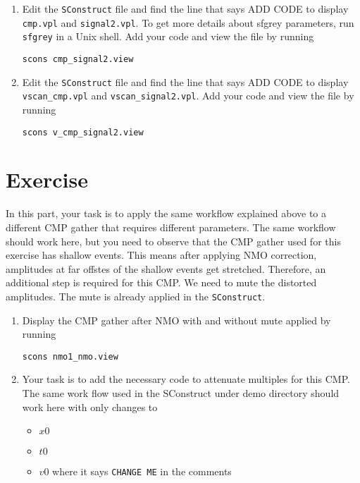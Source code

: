 \begin{enumerate}
\item Edit the \texttt{SConstruct} file and find the line that says ADD CODE to display \texttt{cmp.vpl} and \texttt{signal2.vpl}. To get more details about sfgrey parameters, run \texttt{sfgrey} in a Unix shell. Add your code and view the file by running
\begin{verbatim}
scons cmp_signal2.view
\end{verbatim}

\item Edit the \texttt{SConstruct} file and find the line that says ADD CODE to display \texttt{vscan\_cmp.vpl} and \texttt{vscan\_signal2.vpl}.  Add your code and view the file by running
\begin{verbatim}
scons v_cmp_signal2.view
\end{verbatim}


\end{enumerate}

\lstset{language=python,numbers=left,numberstyle=\tiny,showstringspaces=false}


\section{Exercise}

In this part, your task is to apply the same workflow explained above to a different CMP gather that requires different parameters. The same workflow should work here, but you need to observe that the CMP gather used for this exercise has shallow events. This means after applying NMO correction, amplitudes at far offstes of the shallow events get stretched. Therefore, an additional step is required for this CMP. We need to mute the distorted amplitudes. The mute is already applied in the \texttt{SConstruct}. 
\begin{enumerate}

\item Display the CMP gather after NMO with and without mute applied by running 
\begin{verbatim}
scons nmo1_nmo.view
\end{verbatim}

\item Your task is to add the necessary code to attenuate multiples for this CMP.
The same work flow used in the SConstruct under demo directory should work here with only changes to 
\begin{itemize}
\item $x0$
\item $t0$
\item $v0$
\newline where it says \texttt{CHANGE ME} in the comments
\end{itemize}

\end{enumerate}

